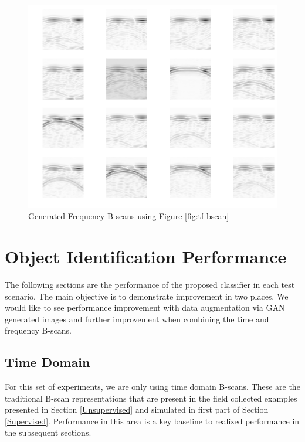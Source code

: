 \begin{figure}[H]
    \centering
    \includegraphics[width=\linewidth]{figures/freq_grid.png}
    \caption{Generated Frequency B-scans using Figure \ref{fig:tf-bscan}}
    \label{fig:freq_grid}
\end{figure}

\section{Object Identification Performance}
The following sections are the performance of the proposed classifier in each test scenario. The main objective is to demonstrate improvement in two places. We would like to see performance improvement with data augmentation via GAN generated images and further improvement when combining the time and frequency B-scans. 

\subsection{Time Domain}
For this set of experiments, we are only using time domain B-scans. These are the traditional B-scan representations that are present in the field collected examples presented in Section \ref{Unsupervised} and simulated in first part of Section \ref{Supervised}. Performance in this area is a key baseline to realized performance in the subsequent sections. 

